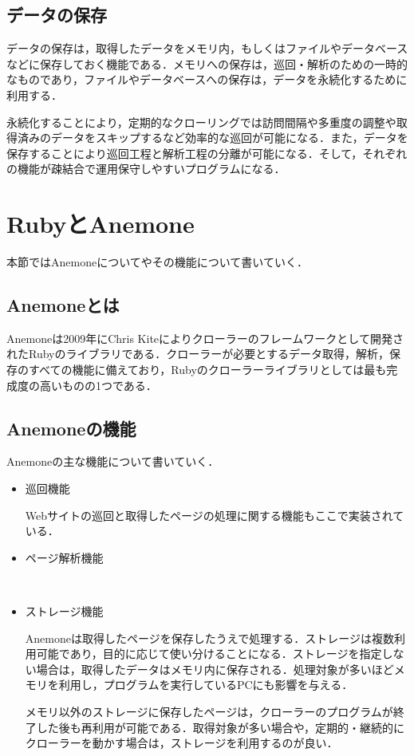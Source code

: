 \subsection{データの保存}

データの保存は，取得したデータをメモリ内，もしくはファイルやデータベースなどに保存しておく機能である．メモリへの保存は，巡回・解析のための一時的なものであり，ファイルやデータベースへの保存は，データを永続化するために利用する．

永続化することにより，定期的なクローリングでは訪問間隔や多重度の調整や取得済みのデータをスキップするなど効率的な巡回が可能になる．また，データを保存することにより巡回工程と解析工程の分離が可能になる．そして，それぞれの機能が疎結合で運用保守しやすいプログラムになる\cite{miyake}．


\section{RubyとAnemone}
本節ではAnemoneについてやその機能について書いていく．


\subsection{Anemoneとは}
Anemoneは2009年にChris Kiteによりクローラーのフレームワークとして開発されたRubyのライブラリである．クローラーが必要とするデータ取得，解析，保存のすべての機能に備えており，Rubyのクローラーライブラリとしては最も完成度の高いものの1つである．

\subsection{Anemoneの機能}
Anemoneの主な機能について書いていく．

\begin{itemize}
  \item 巡回機能

Webサイトの巡回と取得したページの処理に関する機能もここで実装されている．
  \item ページ解析機能


　\item ストレージ機能

Anemoneは取得したページを保存したうえで処理する．ストレージは複数利用可能であり，目的に応じて使い分けることになる．ストレージを指定しない場合は，取得したデータはメモリ内に保存される．処理対象が多いほどメモリを利用し，プログラムを実行しているPCにも影響を与える．

メモリ以外のストレージに保存したページは，クローラーのプログラムが終了した後も再利用が可能である．取得対象が多い場合や，定期的・継続的にクローラーを動かす場合は，ストレージを利用するのが良い．
\end{itemize}

